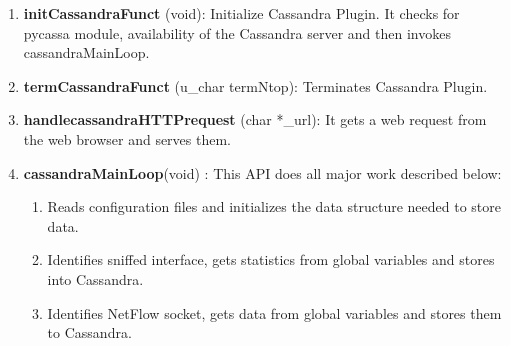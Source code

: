       \begin{enumerate}
       \item {\bf initCassandraFunct } (void): Initialize Cassandra Plugin. It checks for pycassa module, availability of the Cassandra server and then invokes cassandraMainLoop.
       \item {\bf termCassandraFunct} (u\_char termNtop): Terminates Cassandra Plugin.
       \item {\bf handlecassandraHTTPrequest} (char *\_url): It gets a web request from the web browser and serves them.\\
       \item {\bf cassandraMainLoop}(void) : This API does all major work described below:
	      \begin{enumerate}
	      \item Reads configuration files and initializes the data structure needed to store data.
	       \item Identifies sniffed interface, gets statistics from global variables and stores into Cassandra.
	       \item Identifies NetFlow socket, gets data from global variables and stores them to Cassandra. 
	      \end{enumerate}
      \end{enumerate}

